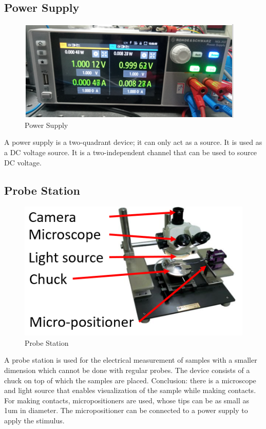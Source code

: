 \documentclass[12pt,a4paper,bold]{thesis}
\theoremstyle{thm}
\theoremstyle{definition}
\begin{document}
\subsection{Power Supply}
\begin{figure}[H]
	\centering
   \includegraphics[scale=0.56]{Images/15.png} 
   \caption{Power Supply}
\end{figure}
A power supply is a two-quadrant device; it can only act as a source. It is used as a DC voltage source. It is a two-independent channel that can be used to source DC voltage.  

\subsection{Probe Station}
\begin{figure}[H]
	\centering
   \includegraphics[scale=0.56]{Images/16.png} 
   \caption{Probe Station}
\end{figure}
A probe station is used for the electrical measurement of samples with a smaller dimension which cannot be done with regular probes. The device consists of a chuck on top of which the samples are placed. Conclusion: there is a microscope and light source that enables visualization of the sample while making contacts. For making contacts, micropositioners are used, whose tips can be as small as 1um in diameter. The micropositioner can be connected to a power supply to apply the stimulus.
\end{document}
